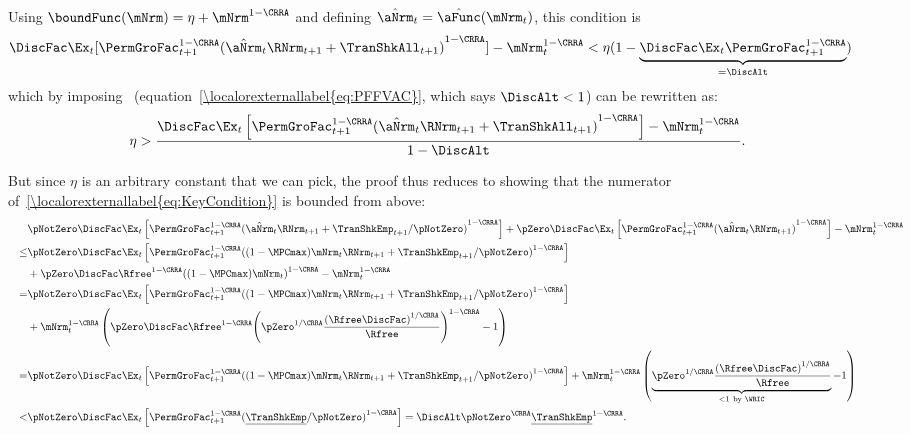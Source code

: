 \documentclass[\econtexRoot/BufferStockTheory]{subfiles}
\begin{document}
Using $\boundFunc(\mNrm)= \eta + \mNrm^{1-\CRRA}$
and defining $\hat{\aNrm}_{t}=\hat{\aFunc}(\mNrm_{t})$, this condition is
\begin{align*}
  \DiscFac \Ex_{t}[{\PermGroFac}_{t+1}^{1-\CRRA}{(\hat{\aNrm}_{t}\RNrm_{t+1}+\TranShkAll_{t+1})}^{1-\CRRA}]-\mNrm_{t}^{1-\CRRA}  & < \eta(1-\underbrace{\DiscFac\Ex_{t}{\PermGroFac}_{t+1}^{1-\CRRA}}_{=\DiscAlt})
\end{align*}
which by imposing \PFFVAC~(equation~\eqref{\localorexternallabel{eq:PFFVAC}}, which says $\DiscAlt<1$) can be rewritten as:
\begin{equation}\begin{gathered}\begin{aligned}
      \eta>\frac{\DiscFac \Ex_{t}\left[{\PermGroFac}_{t+1}^{1-\CRRA}{(\hat{\aNrm}_{t}\RNrm_{t+1}+\TranShkAll_{t+1})}^{1-\CRRA}\right]-\mNrm_{t}^{1-\CRRA}}{1-\DiscAlt}\label{eq:KeyCondition}.
    \end{aligned}\end{gathered}\end{equation}

But since $\eta$ is an arbitrary constant that we can pick, the proof thus reduces to showing that the numerator of~\eqref{\localorexternallabel{eq:KeyCondition}} is bounded from above:
\begin{equation}\begin{gathered}\begin{aligned}%
      \lefteqn{\pNotZero\DiscFac\Ex_{t}\left[{\PermGroFac}_{t+1}^{1-\CRRA}{(\hat{\aNrm}_{t}\RNrm_{t+1}+\TranShkEmp_{t+1}/\pNotZero)}^{1-\CRRA}\right]
        +\pZero\DiscFac\Ex_{t}\left[{\PermGroFac}_{t+1}^{1-\CRRA}{(\hat{\aNrm}_{t}\RNrm_{t+1})}^{1-\CRRA}\right]-\mNrm_{t}^{1-\CRRA}\notag~~~}  \\ 
      ~~~\leq & \pNotZero\DiscFac\Ex_{t}\left[{\PermGroFac}_{t+1}^{1-\CRRA}{((1-\MPCmax)\mNrm_{t}\RNrm_{t+1}+\TranShkEmp_{t+1}/\pNotZero)}^{1-\CRRA}\right]
      \\ & +\pZero\DiscFac\Rfree^{1-\CRRA}{((1-\MPCmax)\mNrm_{t})}^{1-\CRRA}-\mNrm_{t}^{1-\CRRA}\notag\\
      ~~~= & \pNotZero\DiscFac\Ex_{t}\left[{\PermGroFac}_{t+1}^{1-\CRRA}{((1-\MPCmax)\mNrm_{t}\RNrm_{t+1}+\TranShkEmp_{t+1}/\pNotZero)}^{1-\CRRA}\right]
      \\ & +\mNrm_{t}^{1-\CRRA}\left(\pZero\DiscFac\Rfree^{1-\CRRA}{\left(\pZero^{1/\CRRA}\frac{{(\Rfree\DiscFac)}^{1/\CRRA}}{\Rfree}\right)}^{1-\CRRA}-1\right)\notag\\
      ~~~ =  & \pNotZero\DiscFac\Ex_{t}\left[{\PermGroFac}_{t+1}^{1-\CRRA}{((1-\MPCmax)\mNrm_{t}\RNrm_{t+1}+\TranShkEmp_{t+1}/\pNotZero)}^{1-\CRRA}\right]
      +\mNrm_{t}^{1-\CRRA}\left(\underbrace{\pZero^{1/\CRRA}\frac{{(\Rfree\DiscFac)}^{1/\CRRA}}{\Rfree}}_{<1~\text{by
            \WRIC}}-1\right) \label{eq:WRICBites} \\
      ~~~< &\pNotZero\DiscFac\Ex_{t}\left[{\PermGroFac}_{t+1}^{1-\CRRA}{(\underline{\TranShkEmp}/\pNotZero)}^{1-\CRRA}\right]=\DiscAlt\pNotZero^{\CRRA}\underline{\TranShkEmp}^{1-\CRRA} \notag
      .
    \end{aligned}\end{gathered}\end{equation}
\end{document}
